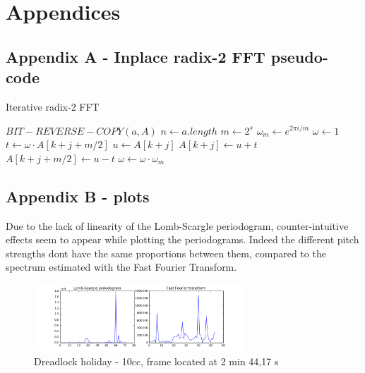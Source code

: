\documentclass[letterpaper]{article}
\begin{document}
\section{Appendices}

\subsection{Appendix A - Inplace radix-2 FFT pseudo-code}

\begin{algorithm}
\caption{Iterative radix-2 FFT}\label{fft}
\begin{algorithmic}[1]
\State $BIT-REVERSE-COPY(a, A)$
\State $n \gets a.length$
	\State $m \gets 2^{s}$
	\State $\omega_m \gets e^{2\pi i / m} $
		\State $\omega \gets 1$
			\State $t \gets \omega \cdot A[k + j + m/2]$
			\State $u \gets A[k + j]$
			\State $A[k + j] \gets u + t$
			\State $A[k + j + m/2] \gets u - t$
			\State $\omega \gets \omega \cdot \omega_m$
		\EndFor
	\EndFor
\EndFor
\EndProcedure
\end{algorithmic}
\end{algorithm}

\subsection{Appendix B - plots}

Due to the lack of linearity of the Lomb-Scargle periodogram, counter-intuitive effects seem to appear while plotting the periodograms. Indeed the different pitch strengths don\textquotesingle t have the same proportions between them, compared to the spectrum estimated with the Fast Fourier Transform.

\begin{figure}[h!]
\begin{center}
\includegraphics[width=3.1in,angle=0]{imgs/1frame.png}
\caption{Dreadlock holiday - 10cc, frame located at 2 min 44,17 s}
\label{fig:frame1}
\end{center}
\end{figure}
\end{document}
